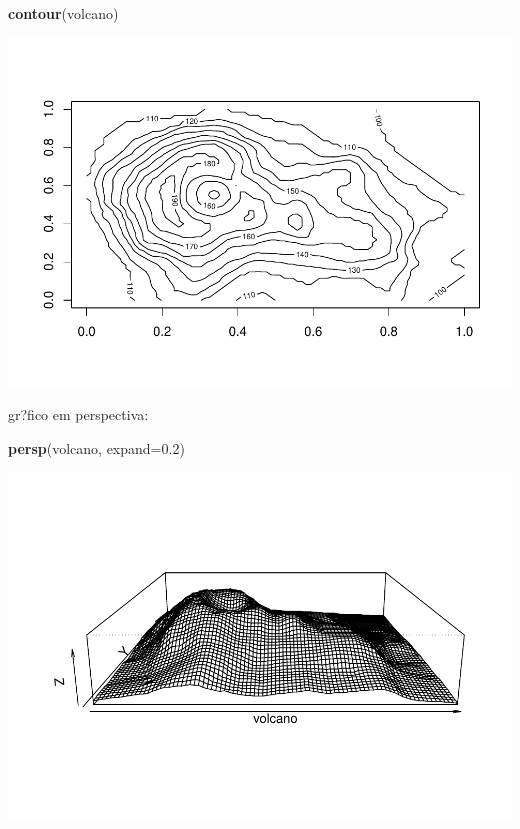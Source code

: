 \documentclass[]{book}
\newenvironment{Shaded}{\begin{snugshade}}{\end{snugshade}}
\newcommand{\DataTypeTok}[1]{\textcolor[rgb]{0.13,0.29,0.53}{#1}}
\newcommand{\FloatTok}[1]{\textcolor[rgb]{0.00,0.00,0.81}{#1}}
\newcommand{\KeywordTok}[1]{\textcolor[rgb]{0.13,0.29,0.53}{\textbf{#1}}}
\newcommand{\NormalTok}[1]{#1}
\begin{document}
\begin{Shaded}
\begin{Highlighting}[]
\KeywordTok{contour}\NormalTok{(volcano)}
\end{Highlighting}
\end{Shaded}

\includegraphics{TudodoR_files/figure-latex/unnamed-chunk-74-1.pdf}

gr?fico em perspectiva:

\begin{Shaded}
\begin{Highlighting}[]
\KeywordTok{persp}\NormalTok{(volcano, }\DataTypeTok{expand=}\FloatTok{0.2}\NormalTok{)}
\end{Highlighting}
\end{Shaded}

\includegraphics{TudodoR_files/figure-latex/unnamed-chunk-75-1.pdf}
\end{document}
